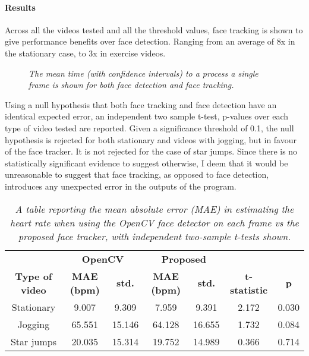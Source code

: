 \paragraph{Results}
Across all the videos tested and all the threshold values, face tracking is shown to give performance benefits over face detection.
Ranging from an average of 8x in the stationary case, to 3x in exercise videos.
\begin{figure}
    \centering
    \scalebox{0.8}{}
   \caption{\textit{The mean time (with confidence intervals) to a process a single frame is shown for both face detection and face tracking.}} 
\end{figure}
\noindent
Using a null hypothesis that both face tracking and face detection have an identical expected error, an independent two sample t-test, p-values over each type of video tested are reported.
Given a significance threshold of 0.1, the null hypothesis is rejected for both stationary and videos with jogging, but in favour of the face tracker.
It is not rejected for the case of star jumps. Since there is no statistically significant evidence to suggest otherwise,
 I deem that it would be unreasonable to suggest that face tracking, as opposed to face detection, introduces any unexpected error in the outputs of the program.
%     
\begin{table}
    \begin{tabular}{c|cc|cc|cc}
    \multicolumn{1}{l|}{} & \multicolumn{2}{c}{\textbf{OpenCV}} & \multicolumn{2}{c|}{\textbf{Proposed}} & \multicolumn{1}{l}{} & \multicolumn{1}{l}{} \\
    \textbf{Type of video} & \textbf{MAE (bpm)} & \textbf{std.} & \textbf{MAE (bpm)} & \textbf{std.} & \textbf{t-statistic} & \textbf{p} \\ \hline
    Stationary & 9.007 & 9.309 & 7.959 & 9.391 & 2.172 & 0.030 \\
    Jogging & 65.551 & 15.146 & 64.128 & 16.655 & 1.732 & 0.084 \\
    \rowcolor[HTML]{EFEFEF} 
    Star jumps & 20.035 & 15.314 & 19.752 & 14.989 & 0.366 & 0.714 \\ \hline
    \end{tabular}
    \caption{\textit{A table reporting the mean absolute error (MAE) in estimating the heart rate when using the OpenCV face detector on each frame vs the proposed face tracker, with independent two-sample t-tests shown. }}
    \end{table}

